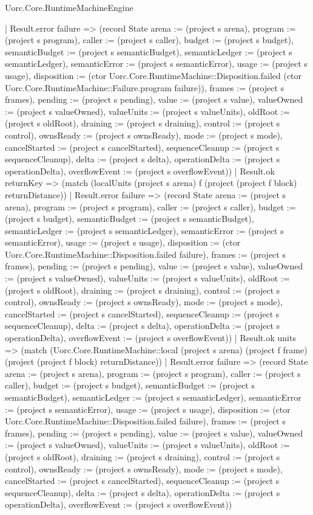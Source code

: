 \begin{lexlean}{Uorc.Core.RuntimeMachineEngine}
\begin{semanticmodule}
{      | Result.error failure => (record State {arena := (project s arena), program := (project s program), caller := (project s caller), budget := (project s budget), semanticBudget := (project s semanticBudget), semanticLedger := (project s semanticLedger), semanticError := (project s semanticError), usage := (project s usage), disposition := (ctor Uorc.Core.RuntimeMachine::Disposition.failed (ctor Uorc.Core.RuntimeMachine::Failure.program failure)), frames := (project s frames), pending := (project s pending), value := (project s value), valueOwned := (project s valueOwned), valueUnits := (project s valueUnits), oldRoot := (project s oldRoot), draining := (project s draining), control := (project s control), ownsReady := (project s ownsReady), mode := (project s mode), cancelStarted := (project s cancelStarted), sequenceCleanup := (project s sequenceCleanup), delta := (project s delta), operationDelta := (project s operationDelta), overflowEvent := (project s overflowEvent)})
      | Result.ok returnKey => (match (localUnits (project s arena) f (project (project f block) returnDistance))
        | Result.error failure => (record State {arena := (project s arena), program := (project s program), caller := (project s caller), budget := (project s budget), semanticBudget := (project s semanticBudget), semanticLedger := (project s semanticLedger), semanticError := (project s semanticError), usage := (project s usage), disposition := (ctor Uorc.Core.RuntimeMachine::Disposition.failed failure), frames := (project s frames), pending := (project s pending), value := (project s value), valueOwned := (project s valueOwned), valueUnits := (project s valueUnits), oldRoot := (project s oldRoot), draining := (project s draining), control := (project s control), ownsReady := (project s ownsReady), mode := (project s mode), cancelStarted := (project s cancelStarted), sequenceCleanup := (project s sequenceCleanup), delta := (project s delta), operationDelta := (project s operationDelta), overflowEvent := (project s overflowEvent)})
        | Result.ok units => (match (Uorc.Core.RuntimeMachine::local (project s arena) (project f frame) (project (project f block) returnDistance))
          | Result.error failure => (record State {arena := (project s arena), program := (project s program), caller := (project s caller), budget := (project s budget), semanticBudget := (project s semanticBudget), semanticLedger := (project s semanticLedger), semanticError := (project s semanticError), usage := (project s usage), disposition := (ctor Uorc.Core.RuntimeMachine::Disposition.failed failure), frames := (project s frames), pending := (project s pending), value := (project s value), valueOwned := (project s valueOwned), valueUnits := (project s valueUnits), oldRoot := (project s oldRoot), draining := (project s draining), control := (project s control), ownsReady := (project s ownsReady), mode := (project s mode), cancelStarted := (project s cancelStarted), sequenceCleanup := (project s sequenceCleanup), delta := (project s delta), operationDelta := (project s operationDelta), overflowEvent := (project s overflowEvent)})
}
\end{semanticmodule}
\end{lexlean}
